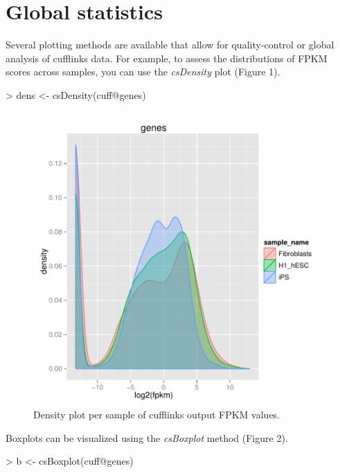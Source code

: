 \documentclass[10pt]{article}
\newcommand{\Rmethod}[1]{{\textit{#1}}}
\begin{document}
\section{Global statistics}
Several plotting methods are available that allow for quality-control or global analysis of cufflinks data. For example, to assess the
distributions of FPKM scores across samples, you can use the \Rmethod{csDensity} plot (Figure 1).
\begin{Schunk}
\begin{Sinput}
> dens <- csDensity(cuff@genes)
\end{Sinput}
\end{Schunk}

\begin{figure}[ht]
\begin{center}
\includegraphics{cummeRbund-manual-global_plots_dens}

\end{center}
\caption{Density plot per sample of cufflinks output FPKM values.}
\end{figure}

Boxplots can be visualized using the \Rmethod{csBoxplot} method (Figure 2).
\begin{Schunk}
\begin{Sinput}
> b <- csBoxplot(cuff@genes)
\end{Sinput}
\end{Schunk}
\end{document}
